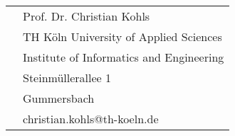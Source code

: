 \begin{titlepage}
\begin{center}
\begin{tabular}{rl}
						&  	\quad Prof. Dr. Christian Kohls\\
						&  	\quad TH Köln University of Applied Sciences\\
						&  	\quad Institute of Informatics and Engineering\\
						&	\quad Steinmüllerallee 1\\
						&	\quad 51643 Gummersbach\\
						&  	\quad christian.kohls@th-koeln.de\\[2.0em]
		\end{tabular}
	\end{center}

\end{titlepage}